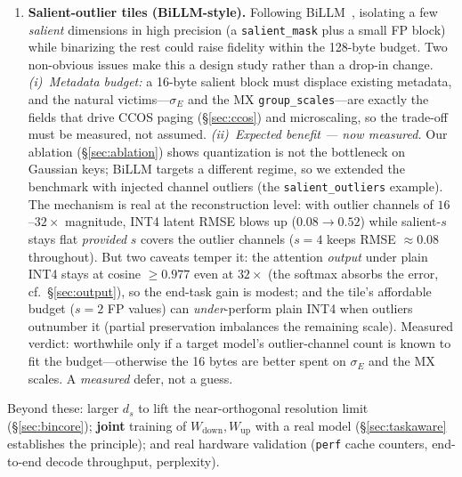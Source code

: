 \documentclass[11pt]{article}
\newcommand{\deleted}[1]{\textcolor{revisionred}{#1}}
\theoremstyle{plain}
\theoremstyle{definition}
\newcommand{\ds}{d_s}
\newcommand{\sigE}{\sigma_E}
\begin{document}
\begin{enumerate}[leftmargin=1.6em,itemsep=2pt]
    $\Rightarrow$ 128'' assumption we measured and discarded. For
    cross-compilation the host line size is irrelevant, so the safe 64-byte
    default holds. A portability refinement, not a correctness change: the tile
    stays 128~bytes with zero padding either way, and on every one of our
    targets the result is unchanged (\texttt{align(64)}).
  \item \textbf{Salient-outlier tiles (BiLLM-style).} Following
    BiLLM~\cite{billm}, isolating a few \emph{salient} dimensions in high
    precision (a \texttt{salient\_mask} plus a small FP block) while
    binarizing the rest could raise fidelity within the 128-byte budget. Two
    non-obvious issues make this a design study rather than a drop-in change.
    \emph{(i)~Metadata budget:} a 16-byte salient block must displace
    existing metadata, and the natural victims---$\sigE$ and the MX
    \texttt{group\_scales}---are exactly the fields that drive CCOS paging
    (\S\ref{sec:ccos}) and microscaling, so the trade-off must be measured,
    not assumed. \emph{(ii)~Expected benefit --- now measured.} Our ablation
    (\S\ref{sec:ablation}) shows quantization is not the bottleneck on Gaussian
    keys; BiLLM targets a different regime, so we extended the benchmark with
    injected channel outliers (the \texttt{salient\_outliers} example). The
    mechanism is real at the reconstruction level: with outlier channels of
    $16$--$32\times$ magnitude, INT4 latent RMSE blows up ($0.08\!\to\!0.52$)
    while salient-$s$ stays flat \emph{provided} $s$ covers the outlier channels
    ($s{=}4$ keeps RMSE $\approx 0.08$ throughout). But two caveats temper it:
    the attention \emph{output} under plain INT4 stays at cosine $\ge 0.977$
    even at $32\times$ (the softmax absorbs the error, cf.\
    \S\ref{sec:output}), so the end-task gain is modest; and the tile's
    affordable budget ($s{=}2$ FP values) can \emph{under}-perform plain INT4
    when outliers outnumber it (partial preservation imbalances the remaining
    scale). Measured verdict: worthwhile only if a target model's
    outlier-channel count is known to fit the budget---otherwise the 16 bytes
    are better spent on $\sigE$ and the MX scales. A \emph{measured} defer, not
    a guess.
\end{enumerate}

\deleted{Beyond these: larger $\ds$ to lift the near-orthogonal resolution limit
(\S\ref{sec:bincore}); \textbf{joint} training of $W_{\text{down}},
W_{\text{up}}$ with a real model (\S\ref{sec:taskaware} establishes the
principle); and real hardware validation (\texttt{perf} cache counters,
end-to-end decode throughput, perplexity).}
\end{document}
